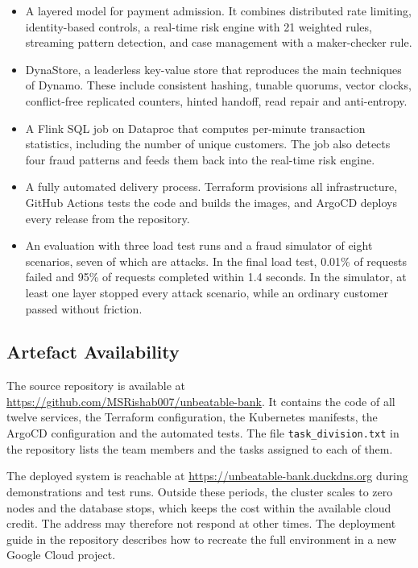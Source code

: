 \documentclass[11pt,a4paper]{article}
\newcommand{\repourl}{\url{https://github.com/MSRishab007/unbeatable-bank}}
\newcommand{\liveurl}{\url{https://unbeatable-bank.duckdns.org}}
\newcommand{\code}[1]{\texttt{#1}}
\begin{document}
\begin{itemize}
\item A layered model for payment admission. It combines distributed rate limiting, identity-based controls, a real-time risk engine with 21 weighted rules, streaming pattern detection, and case management with a maker-checker rule.
\item DynaStore, a leaderless key-value store that reproduces the main techniques of Dynamo. These include consistent hashing, tunable quorums, vector clocks, conflict-free replicated counters, hinted handoff, read repair and anti-entropy.
\item A Flink SQL job on Dataproc that computes per-minute transaction statistics, including the number of unique customers. The job also detects four fraud patterns and feeds them back into the real-time risk engine.
\item A fully automated delivery process. Terraform provisions all infrastructure, GitHub Actions tests the code and builds the images, and ArgoCD deploys every release from the repository.
\item An evaluation with three load test runs and a fraud simulator of eight scenarios, seven of which are attacks. In the final load test, 0.01\% of requests failed and 95\% of requests completed within 1.4 seconds. In the simulator, at least one layer stopped every attack scenario, while an ordinary customer passed without friction.
\end{itemize}

\subsection{Artefact Availability}
\label{sec:artefacts}

The source repository is available at \repourl{}. It contains the code of all twelve services, the Terraform configuration, the Kubernetes manifests, the ArgoCD configuration and the automated tests. The file \code{task\_division.txt} in the repository lists the team members and the tasks assigned to each of them.

The deployed system is reachable at \liveurl{} during demonstrations and test runs. Outside these periods, the cluster scales to zero nodes and the database stops, which keeps the cost within the available cloud credit. The address may therefore not respond at other times. The deployment guide in the repository describes how to recreate the full environment in a new Google Cloud project.
\end{document}
